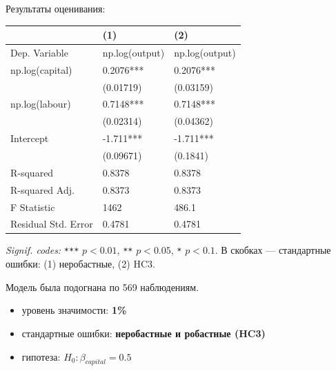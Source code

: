\documentclass[
  russian,
]{article}
\newcounter{none} %
\providecommand{\tightlist}{%
  \setlength{\itemsep}{0pt}\setlength{\parskip}{0pt}}
\begin{document}
Результаты оценивания:

{\def\LTcaptype{none} %
\begin{longtable}[]{@{}lll@{}}
\toprule\noalign{}
& (1) & (2) \\
\midrule\noalign{}
\endhead
\bottomrule\noalign{}
\endlastfoot
Dep. Variable & np.log(output) & np.log(output) \\
np.log(capital) & 0.2076*** & 0.2076*** \\
& (0.01719) & (0.03159) \\
np.log(labour) & 0.7148*** & 0.7148*** \\
& (0.02314) & (0.04362) \\
Intercept & -1.711*** & -1.711*** \\
& (0.09671) & (0.1841) \\
R-squared & 0.8378 & 0.8378 \\
R-squared Adj. & 0.8373 & 0.8373 \\
F Statistic & 1462 & 486.1 \\
Residual Std. Error & 0.4781 & 0.4781 \\
\end{longtable}
}

\emph{Signif. codes:} \texttt{***} \(p<0.01\), \texttt{**} \(p<0.05\),
\texttt{*} \(p<0.1\). В скобках --- стандартные ошибки: (1) неробастные,
(2) HC3.

Модель была подогнана по 569 наблюдениям.

\begin{tcolorbox}[enhanced jigsaw, arc=.35mm, bottomrule=.15mm, bottomtitle=1mm, breakable, colback=white, colbacktitle=quarto-callout-important-color!10!white, colframe=quarto-callout-important-color-frame, coltitle=black, left=2mm, leftrule=.75mm, opacityback=0, opacitybacktitle=0.6, rightrule=.15mm, title=\textcolor{quarto-callout-important-color}{\faExclamation}\hspace{0.5em}{Условия теста}, titlerule=0mm, toprule=.15mm, toptitle=1mm]

\begin{itemize}
\tightlist
\item
  уровень значимости: \textbf{1\%}
\item
  стандартные ошибки: \textbf{неробастные и робастные (HC3)}
\item
  гипотеза: \(H_0:\beta_{capital}=0.5\)
\end{itemize}

\end{tcolorbox}
\end{document}
